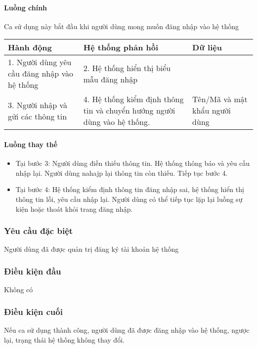\documentclass[./../main_file.tex]{subfiles}
\begin{document}
		\paragraph{Luồng chính}
		
		Ca sử dụng này bắt đầu khi người dùng mong muốn đăng nhập vào hệ thống
		\begin{longtable}{|p{}|p{}|p{}|}

				\hline
				\textbf{Hành động}                        & \textbf{Hệ thống phản hồi}                                                                    & \textbf{Dữ liệu}              
				\\ \hline
				1. Người dùng yêu cầu đăng nhập vào hệ thống & 2. Hệ thống hiển thị biểu mẫu đăng nhập &                               
				\\ \hline
				3. Người nhập và gửi các thông tin               & 4. Hệ thống kiểm định thông tin và chuyển hướng người dùng vào hệ thống.                      & Tên/Mã và mật khẩu người dùng 
				\\ \hline
				
		\end{longtable}
		\paragraph{Luồng thay thế}
		\begin{itemize}
			\item Tại bước 3: Người dùng điền thiếu thông tin. Hệ thống thông báo và yêu cầu nhập lại. Người dùng nahajp lại thông tin còn thiếu. Tiếp tục bước 4.
			\item Tại bước 4:  Hệ thống kiểm định thông tin đăng nhập sai, hệ thống hiển thị thông tin lỗi, yêu cầu nhập lại. Người dùng có thể tiếp tục lặp lại luồng sự kiện hoặc thoát khỏi trang đăng nhập.
			
		\end{itemize}
	\subsubsection{Yêu cầu đặc biệt}
	Người dùng đã được quản trị đăng ký tài khoản hệ thống
	
	\subsubsection{Điều kiện đầu}
	Không có
	
	\subsubsection{Điều kiện cuối}
	Nếu ca sử dụng thành công, người dùng đã được đăng nhập vào hệ thống, ngược lại, trạng thái hệ thống không thay đổi.
\end{document}
